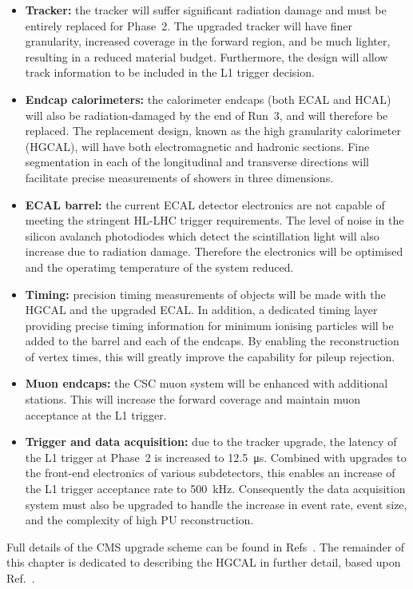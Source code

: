 \begin{itemize}
  \item{\textbf{Tracker:}
  the tracker will suffer significant radiation damage and must be entirely replaced for Phase~2.
  The upgraded tracker will have finer granularity, %
  increased coverage in the forward region, %
  and be much lighter, resulting in a reduced material budget.
  Furthermore, the design will allow track information to be included in the L1 trigger decision.}
  \item{\textbf{Endcap calorimeters:}
  the calorimeter endcaps (both ECAL and HCAL) will also be radiation-damaged by the end of Run~3, and will therefore be replaced.
  The replacement design, known as the high granularity calorimeter (HGCAL), will have both electromagnetic and hadronic sections.
  Fine segmentation in each of the longitudinal and transverse directions will facilitate precise measurements of showers in three dimensions.}
  \item{\textbf{ECAL barrel:}
  the current ECAL detector electronics are not capable of meeting the stringent HL-LHC trigger requirements.
  The level of noise in the silicon avalanch photodiodes which detect the scintillation light will also increase due to radiation damage.
  Therefore the electronics will be optimised and the operatimg temperature of the system reduced.} %
  \item{\textbf{Timing:}
  precision timing measurements of objects will be made with the HGCAL and the upgraded ECAL.
  In addition, a dedicated timing layer providing precise timing information for minimum ionising particles will be added to the barrel and each of the endcaps.
  By enabling the reconstruction of vertex times, this will greatly improve the capability for pileup rejection.}
  \item{\textbf{Muon endcaps:}
  the CSC muon system will be enhanced with additional stations.
  This will increase the forward coverage and maintain muon acceptance at the L1 trigger.}
  \item{\textbf{Trigger and data acquisition:}
  due to the tracker upgrade, the latency of the L1 trigger at Phase~2 is increased to \SI{12.5}{\micro\second}.
  Combined with upgrades to the front-end electronics of various subdetectors, %
  this enables an increase of the L1 trigger acceptance rate to \SI{500}{\kilo\hertz}.
  Consequently the data acquisition system must also be upgraded to handle the increase in event rate, event size, and the complexity of high PU reconstruction.}
\end{itemize}
Full details of the CMS upgrade scheme can be found in Refs~\cite{Tracker_Phase2TDR,Barrel_Phase2TDR,Muon_Phase2TDR,Trigger_Phase2TDR,DAQ_Phase2TDR,MTD,HGCAL}.
The remainder of this chapter is dedicated to describing the HGCAL in further detail, based upon Ref.~\cite{HGCAL}.

